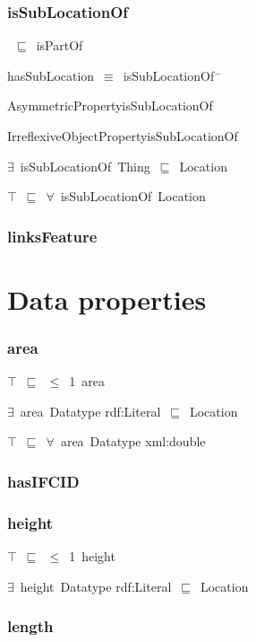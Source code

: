 \documentclass{article}
\begin{document}
\subsubsection*{isSubLocationOf}

~\ensuremath{\sqsubseteq}~isPartOf

hasSubLocation~\ensuremath{\equiv}~isSubLocationOf\ensuremath{^-}

AsymmetricPropertyisSubLocationOf

IrreflexiveObjectPropertyisSubLocationOf

\ensuremath{\exists}~isSubLocationOf~Thing~\ensuremath{\sqsubseteq}~Location

\ensuremath{\top}~\ensuremath{\sqsubseteq}~\ensuremath{\forall}~isSubLocationOf~Location

\subsubsection*{linksFeature}

\section*{Data properties}\subsubsection*{area}

\ensuremath{\top}~\ensuremath{\sqsubseteq}~\ensuremath{\leq}~1~area

\ensuremath{\exists}~area~Datatype rdf:Literal~\ensuremath{\sqsubseteq}~Location

\ensuremath{\top}~\ensuremath{\sqsubseteq}~\ensuremath{\forall}~area~Datatype xml:double

\subsubsection*{hasIFCID}

\subsubsection*{height}

\ensuremath{\top}~\ensuremath{\sqsubseteq}~\ensuremath{\leq}~1~height

\ensuremath{\exists}~height~Datatype rdf:Literal~\ensuremath{\sqsubseteq}~Location

\subsubsection*{length}
\end{document}
